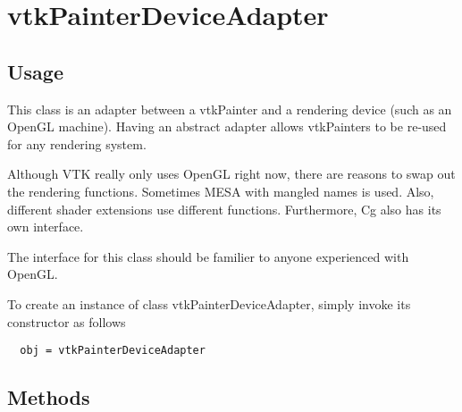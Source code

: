 \section{vtkPainterDeviceAdapter}

\subsection{Usage}


 This class is an adapter between a vtkPainter and a rendering device (such
 as an OpenGL machine).  Having an abstract adapter allows vtkPainters
 to be re-used for any rendering system.

 Although VTK really only uses OpenGL right now, there are reasons to
 swap out the rendering functions.  Sometimes MESA with mangled names
 is used.  Also, different shader extensions use different functions.
 Furthermore, Cg also has its own interface.

 The interface for this class should be familier to anyone experienced
 with OpenGL.


To create an instance of class vtkPainterDeviceAdapter, simply
invoke its constructor as follows
\begin{verbatim}
  obj = vtkPainterDeviceAdapter
\end{verbatim}
\subsection{Methods}

